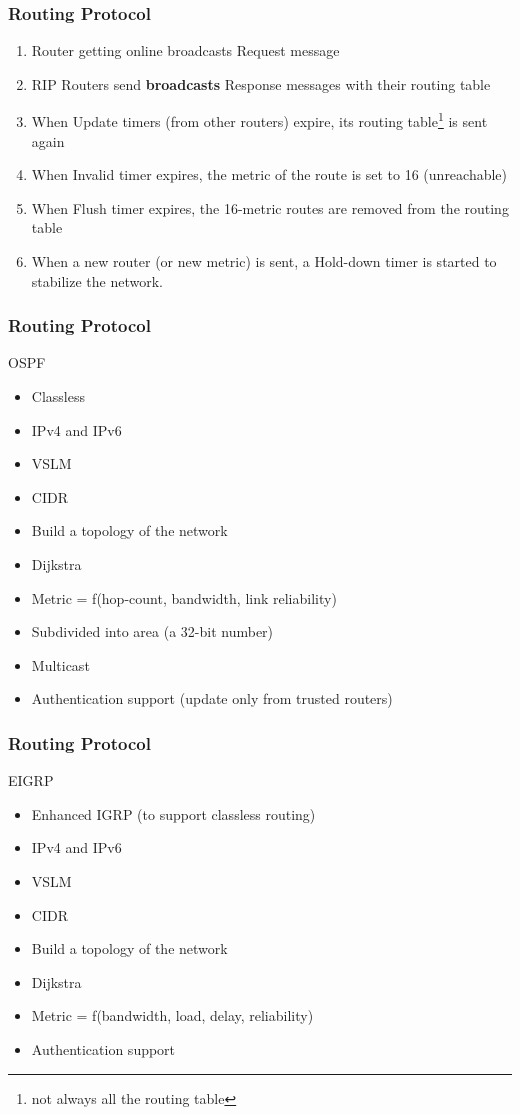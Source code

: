   \begin{frame}
    \frametitle{Routing Protocol}
      \begin{enumerate}
        \item Router getting online broadcasts Request message
        \item RIP Routers send \textbf{broadcasts} Response messages with their routing table
        \item When Update timers (from other routers) expire, its routing table\footnote{not always all the routing table} is sent again
        \item When Invalid timer expires, the metric of the route is set to 16 (unreachable)
        \item When Flush timer expires, the 16-metric routes are removed from the routing table
        \item When a new router (or new metric) is sent, a Hold-down timer is started to stabilize the network.
      \end{enumerate}
  \end{frame}

  \begin{frame}
    \frametitle{Routing Protocol}
    \begin{center}OSPF \end{center}
      \begin{itemize}
        \item Classless
        \item IPv4 and IPv6
        \item VSLM
        \item CIDR
        \item Build a topology of the network
        \item Dijkstra
        \item Metric = f(hop-count, bandwidth, link reliability)
        \item Subdivided into area (a 32-bit number)
        \item Multicast
        \item Authentication support (update only from trusted routers)
      \end{itemize}
  \end{frame}

  \begin{frame}
    \frametitle{Routing Protocol}
    \begin{center}EIGRP \end{center}
      \begin{itemize}
        \item Enhanced IGRP (to support classless routing)
        \item IPv4 and IPv6
        \item VSLM
        \item CIDR
        \item Build a topology of the network
        \item Dijkstra
        \item Metric = f(bandwidth, load, delay, reliability)
        \item Authentication support
      \end{itemize}
  \end{frame}

